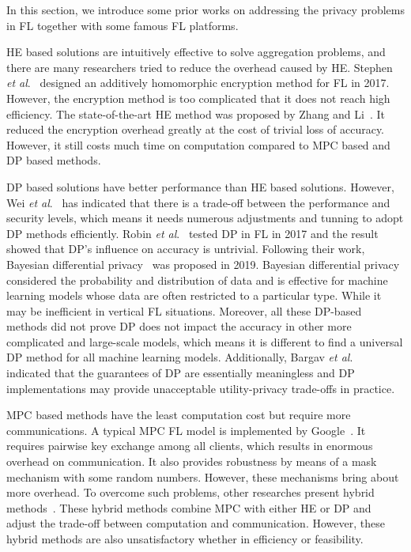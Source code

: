 In this section, we introduce some prior works on addressing the privacy problems in FL together with some famous FL platforms.

HE based solutions are intuitively effective to solve aggregation problems, and there are many researchers tried to reduce the overhead caused by HE. Stephen \emph{et al}.~\cite{abs-1711-10677} designed an additively homomorphic encryption method for FL in 2017. However, the encryption method is too complicated that it does not reach high efficiency. The state-of-the-art HE method was proposed by Zhang and Li~\cite{BatchCrypt}. It reduced the encryption overhead greatly at the cost of trivial loss of accuracy. However, it still costs much time on computation compared to MPC based and DP based methods.

DP based solutions have better performance than HE based solutions. However, Wei \emph{et al}.~\cite{DPAnalysis} has indicated that there is a trade-off between the performance and security levels, which means it needs numerous adjustments and tunning to adopt DP methods efficiently. Robin \emph{et al}.~\cite{geyer2017differentially} tested DP in FL in 2017 and the result showed that DP's influence on accuracy is untrivial. Following their work, Bayesian differential privacy~\cite{Bayesian} was proposed in 2019. Bayesian differential privacy considered the probability and distribution of data and is effective for machine learning models whose data are often restricted to a particular type. While it may be inefficient in vertical FL situations. Moreover, all these DP-based methods did not prove DP does not impact the accuracy in other more complicated and large-scale models, which means it is different to find a universal DP method for all machine learning models. Additionally, Bargav \emph{et al}.~\cite{Bargav19} indicated that the guarantees of DP are essentially meaningless and DP implementations may provide unacceptable utility-privacy trade-offs in practice.

MPC based methods have the least computation cost but require more communications. A typical MPC FL model is implemented by Google~\cite{Practical}. It requires pairwise key exchange among all clients, which results in enormous overhead on communication. It also provides robustness by means of a mask mechanism with some random numbers. However, these mechanisms bring about more overhead. To overcome such problems, other researches present hybrid methods~\cite{Hybrid,HybridAlpha}. These hybrid methods combine MPC with either HE or DP and adjust the trade-off between computation and communication. However, these hybrid methods are also unsatisfactory whether in efficiency or feasibility.

